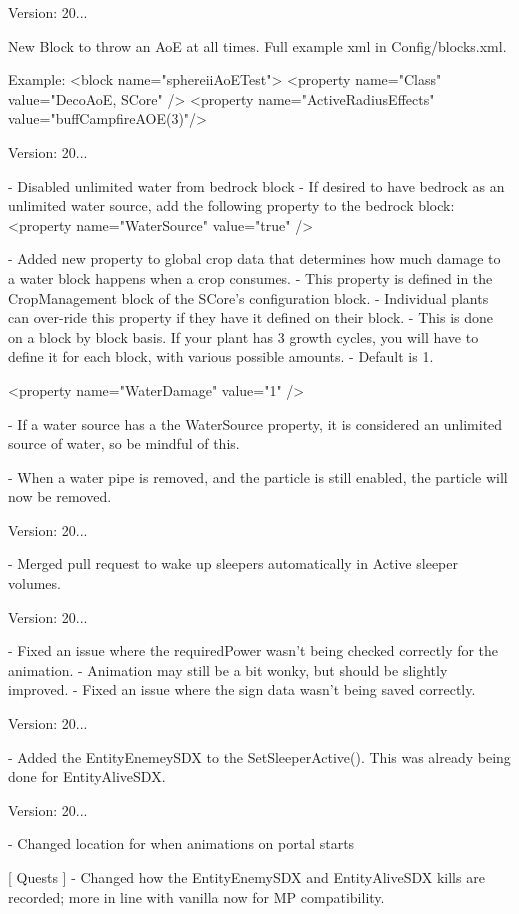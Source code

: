 Version\+: 20... \begin{DoxyVerb}[ Block ]

    New Block to throw an AoE at all times. Full example xml in Config/blocks.xml.

        Example:
        <block name="sphereiiAoETest">
            <property name="Class" value="DecoAoE, SCore" />
            <property name="ActiveRadiusEffects" value="buffCampfireAOE(3)"/>
\end{DoxyVerb}


Version\+: 20... \begin{DoxyVerb}
    - Disabled unlimited water from bedrock block
        - If desired to have bedrock as an unlimited water source, add the following property to the bedrock block:
            <property name="WaterSource" value="true" />

    - Added new property to global crop data that determines how much damage to a water block happens when a crop consumes.
        - This property is defined in the CropManagement block of the SCore's configuration block.
        - Individual plants can over-ride this property if they have it defined on their block.
            - This is done on a block by block basis. If your plant has 3 growth cycles, you will have to define it for each block, with various possible amounts.
        - Default is 1.

        <property name="WaterDamage" value="1" />

    - If a water source has a the WaterSource property, it is considered an unlimited source of water, so be mindful of this.

    - When a water pipe is removed, and the particle is still enabled, the particle will now be removed.
\end{DoxyVerb}
 Version\+: 20... \begin{DoxyVerb}[ Sleepers ]
    - Merged pull request to wake up sleepers automatically in Active sleeper volumes.
\end{DoxyVerb}
 Version\+: 20... \begin{DoxyVerb}[ Portals ]
    - Fixed an issue where the requiredPower wasn't being checked correctly for the animation.
        - Animation may still be a bit wonky, but should be slightly improved.
    - Fixed an issue where the sign data wasn't being saved correctly.
\end{DoxyVerb}
 Version\+: 20... \begin{DoxyVerb}[ Sleepers ]

    - Added the EntityEnemeySDX to the SetSleeperActive(). This was already being done for EntityAliveSDX.
\end{DoxyVerb}
 Version\+: 20... \begin{DoxyVerb}[ Portals ]
    - Changed location for when animations on portal starts

[ Quests ]
    - Changed how the EntityEnemySDX and EntityAliveSDX kills are recorded; more in line with vanilla now for MP compatibility.
\end{DoxyVerb}


